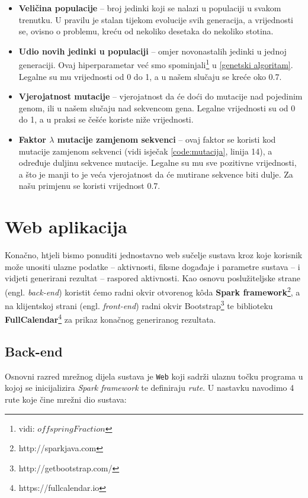 \documentclass[times, utf8, zavrsni]{fer}
\begin{document}
\begin{itemize}
	\item \textbf{Veličina populacije} -- broj jedinki koji se nalazi u populaciji u svakom trenutku. U pravilu je stalan tijekom evolucije svih generacija, a vrijednosti se, ovisno o problemu, kreću od nekoliko desetaka do nekoliko stotina.
	\item \textbf{Udio novih jedinki u populaciji} -- omjer novonastalih jedinki u jednoj generaciji. Ovaj hiperparametar već smo spominjali\footnote{vidi: $offspringFraction$} u \ref{genetski algoritam}. Legalne su mu vrijednosti od 0 do 1, a u našem slučaju se kreće oko 0.7.
	\item \textbf{Vjerojatnost mutacije} -- vjerojatnost da će doći do mutacije nad pojedinim genom, ili u našem slučaju nad sekvencom gena. Legalne vrijednosti su od 0 do 1, a u praksi se češće koriste niže vrijednosti.
	\item \textbf{Faktor $\lambda$ mutacije zamjenom sekvenci} -- ovaj faktor se koristi kod mutacije zamjenom sekvenci (vidi isječak \ref{code:mutacija}, linija 14), a određuje duljinu sekvence mutacije. Legalne su mu sve pozitivne vrijednosti, a što je manji to je veća vjerojatnost da će mutirane sekvence biti dulje. Za našu primjenu se koristi vrijednost 0.7.
	
\end{itemize}

\chapter{Web aplikacija}\label{web aplikacija}
Konačno, htjeli bismo ponuditi jednostavno web sučelje sustava kroz koje korisnik može unositi ulazne podatke -- aktivnosti, fiksne događaje i parametre sustava -- i vidjeti generirani rezultat -- raspored aktivnosti. Kao osnovu poslužiteljske strane (engl. \textit{back-end}) koristit ćemo radni okvir otvorenog k\^{o}da \textbf{Spark framework}\footnote{http://sparkjava.com}, a na klijentskoj strani (engl. \textit{front-end}) radni okvir Bootstrap\footnote{http://getbootstrap.com/} te biblioteku \textbf{FullCalendar}\footnote{https://fullcalendar.io} za prikaz konačnog generiranog rezultata.

\section{Back-end}
Osnovni razred mrežnog dijela sustava je \texttt{Web} koji sadrži ulaznu točku programa u kojoj se inicijalizira \textit{Spark framework} te definiraju \textit{rute}. U nastavku navodimo 4 rute koje čine mrežni dio sustava:
\end{document}
